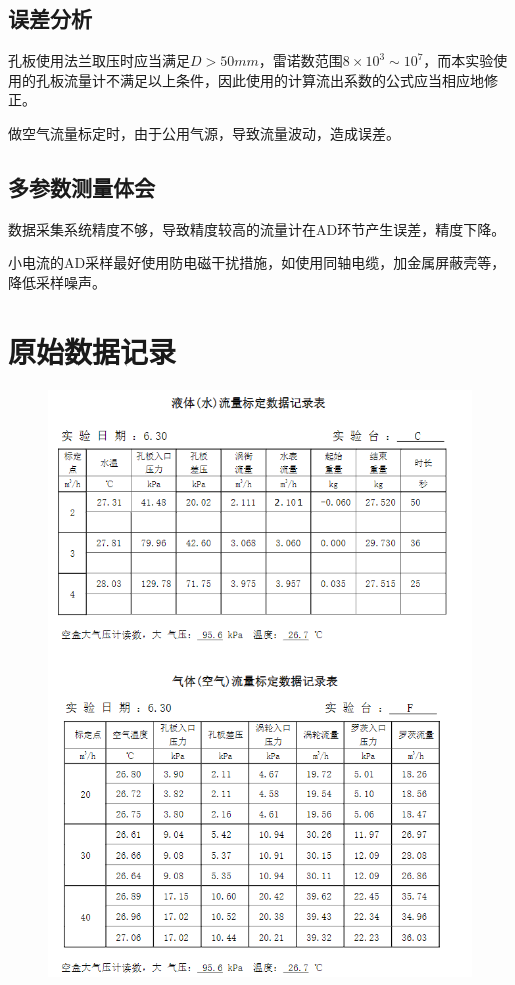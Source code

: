 \documentclass[UTF8]{article}
\begin{document}
	\subsection{误差分析}
	孔板使用法兰取压时应当满足$D > 50 mm$，雷诺数范围$8\times 10^3\sim 10^7$，而本实验使用的孔板流量计不满足以上条件，因此使用的计算流出系数的公式应当相应地修正。
	
	做空气流量标定时，由于公用气源，导致流量波动，造成误差。
	
	\subsection{多参数测量体会}
	数据采集系统精度不够，导致精度较高的流量计在AD环节产生误差，精度下降。
	
	小电流的AD采样最好使用防电磁干扰措施，如使用同轴电缆，加金属屏蔽壳等，降低采样噪声。
	\section{原始数据记录}
	\begin{figure}[H]
		\centering
		\includegraphics[width=0.7\linewidth]{figure/origin}
		\label{fig:origin}
	\end{figure}
	
\end{document}
